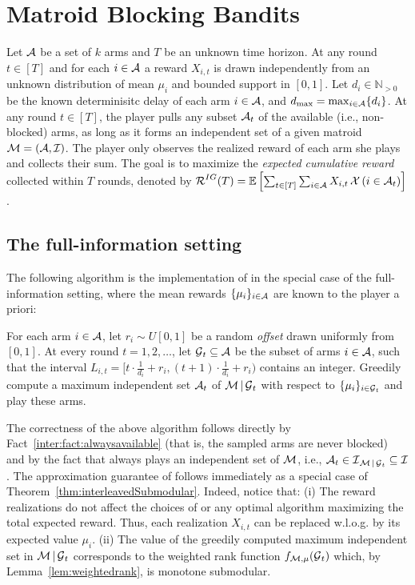 \section{Matroid Blocking Bandits}
\label{section:mbb}
Let $\operatorname{\mathcal{A}}$ be a set of $k$ arms and $T$ be an unknown time horizon. At any round $t \in [T]$ and for each $i \in \operatorname{\mathcal{A}}$ a reward $X_{i,t}$ is drawn independently from an unknown distribution of mean $\mu_{i}$ and bounded support in $[0,1]$. Let $d_i \in \mathbb{N}_{>0}$ be the known determinisitc delay of each arm $i \in \operatorname{\mathcal{A}}$, and $d_{\max} = \max_{i \in \operatorname{\mathcal{A}}}\{d_i\}$. At any round $t \in [T]$, the player pulls any subset $\operatorname{\mathcal{A}}_t$ of the available (i.e., non-blocked) arms, as long as it forms an {independent} set of a given {matroid} $\operatorname{\mathcal{M}} = \left(\operatorname{\mathcal{A}},\operatorname{\mathcal{I}}\right)$. The player only observes the realized reward of each arm she plays and collects their sum. The goal is to maximize the {\em expected cumulative reward} collected within $T$ rounds, denoted by
$\operatorname{\mathcal{R}}^{IG}(T) = \mathop{\underset{ }{\mathbb{E}}\left[\sum_{t \in [T]} \sum_{i \in \operatorname{\mathcal{A}}} X_{i,t} \mathop{\mathcal{X}\left(i \in \operatorname{\mathcal{A}}_t\right)}\right]}$. 

\subsection{The full-information setting}

The following algorithm is the implementation of \IS in the special case of the full-information \mbb setting, where the mean rewards $\{\mu_{i}\}_{i \in \operatorname{\mathcal{A}}}$ are known to the player a priori:


\begin{algorithm}[\ig (\IG)]
For each arm $i \in \operatorname{\mathcal{A}}$, let $r_i \sim U[0,1]$ be a random {\em offset} drawn uniformly from $[0,1]$. 
At every round $t = 1, 2, \dots$,  let $\operatorname{\mathcal{G}}_t \subseteq \operatorname{\mathcal{A}}$ be the subset of arms $i \in \operatorname{\mathcal{A}}$, such that the interval $L_{i,t} = [t\cdot \frac{1}{d_i} + r_i, (t+1) \cdot \frac{1}{d_i} + r_i)$ contains an integer. Greedily compute a maximum independent set $\operatorname{\mathcal{A}}_t$ of $\operatorname{\mathcal{M}}|\operatorname{\mathcal{G}}_t$ with respect to $\{\mu_i\}_{i \in \operatorname{\mathcal{G}}_t}$ and play these arms.
\end{algorithm}

The correctness of the above algorithm follows directly by Fact~\ref{inter:fact:alwaysavailable} (that is, the sampled arms are never blocked) and by the fact that \IG always plays an independent set of $\operatorname{\mathcal{M}}$, i.e., $\operatorname{\mathcal{A}}_t \in \operatorname{\mathcal{I}}_{\operatorname{\mathcal{M}}|\operatorname{\mathcal{G}}_t} \subseteq \operatorname{\mathcal{I}}$. The approximation guarantee of \IG follows immediately as a special case of Theorem~\ref{thm:interleavedSubmodular}. Indeed, notice that: (i) The reward realizations do not affect the choices of \IG or any optimal algorithm maximizing the total expected reward. Thus, each realization $X_{i,t}$ can be replaced w.l.o.g. by its expected value $\mu_i$. (ii) The value of the greedily computed maximum independent set in $\operatorname{\mathcal{M}}|\operatorname{\mathcal{G}}_t$ corresponds to the weighted rank function $f_{\operatorname{\mathcal{M}}, \mu}(\operatorname{\mathcal{G}}_t)$ which, by Lemma~\ref{lem:weightedrank}, is monotone submodular.

